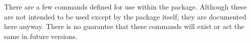 \documentclass[]{article}
\begin{document}
  There are a few commands defined for use within the package. Although these are not intended to be used except by the package itself, they are documented here anyway. There is no guarantee that these commands will exist or act the same in future versions.
\end{document}
